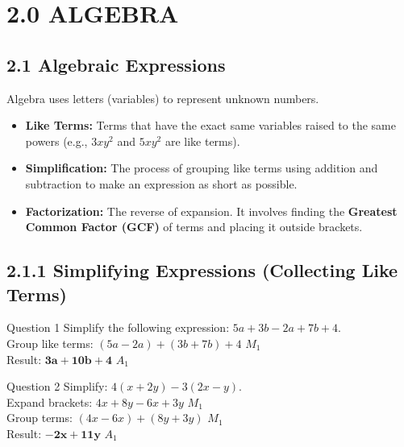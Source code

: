 \documentclass[12pt, a4paper, oneside]{article}
\begin{document}
\section*{2.0 ALGEBRA}

\subsection*{2.1 Algebraic Expressions}

\begin{tcolorbox}[colback=lightgrey, colframe=primaryblue, title=\textbf{Concept Summary: Algebraic Foundations}, arc=5pt]
    Algebra uses letters (variables) to represent unknown numbers.
    \begin{itemize}
        \item \textbf{Like Terms:} Terms that have the exact same variables raised to the same powers (e.g., $3xy^2$ and $5xy^2$ are like terms).
        \item \textbf{Simplification:} The process of grouping like terms using addition and subtraction to make an expression as short as possible.
        \item \textbf{Factorization:} The reverse of expansion. It involves finding the \textbf{Greatest Common Factor (GCF)} of terms and placing it outside brackets.
    \end{itemize}
\end{tcolorbox}

\subsection*{2.1.1 Simplifying Expressions (Collecting Like Terms)}

\begin{solvingbox}{Question 1}
Simplify the following expression: $5a + 3b - 2a + 7b + 4$. \\
Group like terms: $(5a - 2a) + (3b + 7b) + 4$ \hfill $M_1$ \\
Result: $\mathbf{3a + 10b + 4}$ \hfill $A_1$
\end{solvingbox}

\begin{solvingbox}{Question 2}
Simplify: $4(x + 2y) - 3(2x - y)$. \\
Expand brackets: $4x + 8y - 6x + 3y$ \hfill $M_1$ \\
Group terms: $(4x - 6x) + (8y + 3y)$ \hfill $M_1$ \\
Result: $\mathbf{-2x + 11y}$ \hfill $A_1$
\end{solvingbox}
\end{document}
